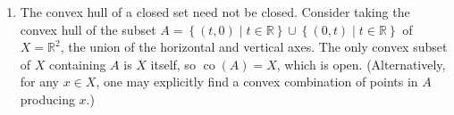 \documentclass[11pt,leqno]{article}
\theoremstyle{plain}
\theoremstyle{definition}
\numberwithin{equation}{section}
\numberwithin{lem}{section}
\newcommand{\cbr}[1]{\left\{#1\right\}}
\DeclareMathOperator{\co}{co}
\begin{document}
\begin{enumerate}
\begin{enumerate}
    \item The convex hull of a closed set need not be closed. Consider taking the convex hull of the subset $A = \cbr{(t,0)\mid t\in \mathbb R}\cup \cbr{(0,t)\mid t\in \mathbb R}$ of $X = \mathbb R^2$, the union of the horizontal and vertical axes. The only convex subset of $X$ containing $A$ is $X$ itself, so $\co(A) = X$, which is open. (Alternatively, for any $x\in X$, one may explicitly find a convex combination of points in $A$ producing $x$.)
  \end{enumerate}
\end{enumerate}
\end{document}
